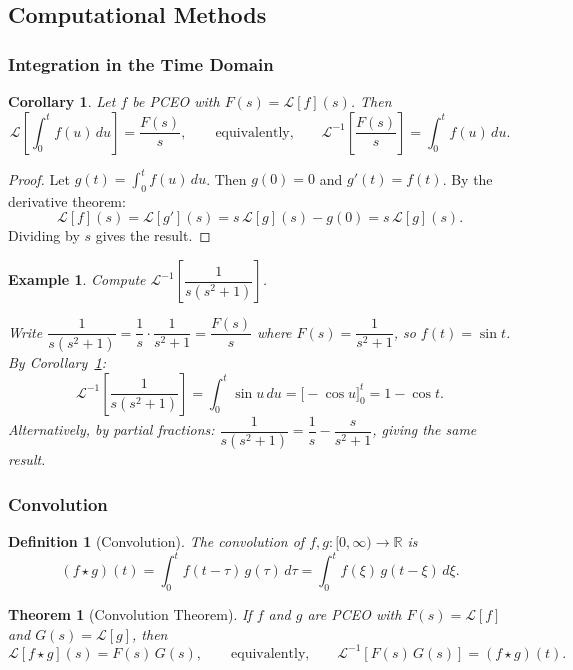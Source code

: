 \documentclass{article}
\newtheorem{theorem}{Theorem}
\newtheorem{corollary}{Corollary}[theorem]
\newtheorem{definition}{Definition}
\newtheorem*{example}{Example}
\newcommand{\Lap}{\mathcal{L}}
\newcommand{\Linv}{\mathcal{L}^{-1}}
\newcommand{\R}{\mathbb{R}}
\newcommand{\conv}{\star}
\begin{document}
\subsection{Computational Methods}

\subsubsection{Integration in the Time Domain}

\begin{corollary}
    \label{cor:integration}
    Let $f$ be PCEO with $F(s) = \Lap[f](s)$. Then
    \[\Lap\!\left[\int_0^t f(u)\,du\right] = \frac{F(s)}{s}, \qquad\text{equivalently,}\qquad \Linv\!\left[\frac{F(s)}{s}\right] = \int_0^t f(u)\,du.\]
\end{corollary}

\begin{proof}
    Let $g(t) = \int_0^t f(u)\,du$. Then $g(0) = 0$ and $g'(t) = f(t)$. By the derivative theorem:
    \[\Lap[f](s) = \Lap[g'](s) = s\,\Lap[g](s) - g(0) = s\,\Lap[g](s).\]
    Dividing by $s$ gives the result.
\end{proof}

\begin{example}
    Compute $\Linv\!\left[\dfrac{1}{s(s^2+1)}\right]$.

    Write $\dfrac{1}{s(s^2+1)} = \dfrac{1}{s}\cdot\dfrac{1}{s^2+1} = \dfrac{F(s)}{s}$ where $F(s) = \dfrac{1}{s^2+1}$, so $f(t) = \sin t$. By Corollary~\ref{cor:integration}:
    \[\Linv\!\left[\frac{1}{s(s^2+1)}\right] = \int_0^t \sin u\,du = \Big[-\cos u\Big]_0^t = 1 - \cos t.\]
    Alternatively, by partial fractions: $\dfrac{1}{s(s^2+1)} = \dfrac{1}{s} - \dfrac{s}{s^2+1}$, giving the same result.
\end{example}

\subsubsection{Convolution}

\begin{definition}[Convolution]
    The convolution of $f,g:[0,\infty)\to\R$ is
    \[(f\conv g)(t) = \int_0^t f(t-\tau)\,g(\tau)\,d\tau = \int_0^t f(\xi)\,g(t-\xi)\,d\xi.\]
\end{definition}

\begin{theorem}[Convolution Theorem]
    If $f$ and $g$ are PCEO with $F(s) = \Lap[f]$ and $G(s) = \Lap[g]$, then
    \[\Lap[f\conv g](s) = F(s)\,G(s), \qquad\text{equivalently,}\qquad \Linv[F(s)\,G(s)] = (f\conv g)(t).\]
\end{theorem}
\end{document}
